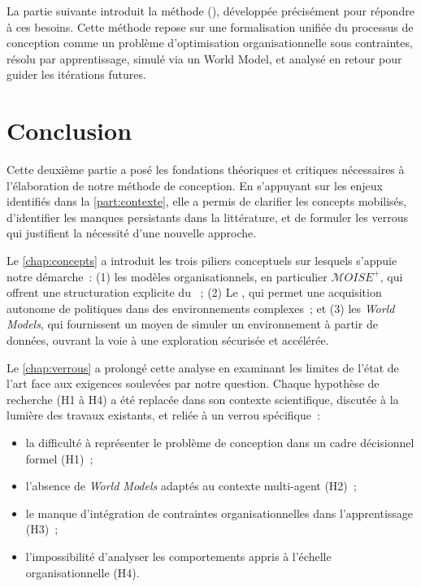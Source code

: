 \medskip

\noindent
La partie suivante introduit la méthode \textbf{} (), développée précisément pour répondre à ces besoins. Cette méthode repose sur une formalisation unifiée du processus de conception comme un problème d'optimisation organisationnelle sous contraintes, résolu par apprentissage, simulé via un World Model, et analysé en retour pour guider les itérations futures.




\clearpage
\thispagestyle{empty}
\null
\newpage

\chapter*{Conclusion}

\noindent
Cette deuxième partie a posé les fondations théoriques et critiques nécessaires à l'élaboration de notre méthode de conception. En s'appuyant sur les enjeux identifiés dans la \autoref{part:contexte}, elle a permis de clarifier les concepts mobilisés, d'identifier les manques persistants dans la littérature, et de formuler les verrous qui justifient la nécessité d'une nouvelle approche.

\medskip

\noindent
Le \autoref{chap:concepts} a introduit les trois piliers conceptuels sur lesquels s'appuie notre démarche~: (1) les modèles organisationnels, en particulier \textit{$\mathcal{M}OISE^+$}, qui offrent une structuration explicite du ~; (2) Le , qui permet une acquisition autonome de politiques dans des environnements complexes~; et (3) les \textit{World Models}, qui fournissent un moyen de simuler un environnement à partir de données, ouvrant la voie à une exploration sécurisée et accélérée.

\noindent
Le \autoref{chap:verrous} a prolongé cette analyse en examinant les limites de l'état de l'art face aux exigences soulevées par notre question. Chaque hypothèse de recherche (H1 à H4) a été replacée dans son contexte scientifique, discutée à la lumière des travaux existants, et reliée à un verrou spécifique~:
\begin{itemize}
  \item la difficulté à représenter le problème de conception dans un cadre décisionnel formel (H1)~;
  \item l'absence de \textit{World Models} adaptés au contexte multi-agent (H2)~;
  \item le manque d'intégration de contraintes organisationnelles dans l'apprentissage (H3)~;
  \item l'impossibilité d'analyser les comportements appris à l'échelle organisationnelle (H4).
\end{itemize}

